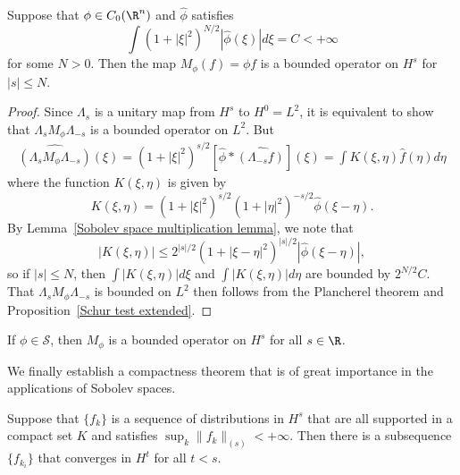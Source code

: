 \begin{theorem}\label{Sobolev space multiplication prop}
Suppose that $\phi\in C_0(\R^n)$ and $\hat{\phi}$ satisfies
\[\int(1+|\xi|^2)^{N/2}|\hat{\phi}(\xi)|d\xi=C<+\infty\]
for some $N>0$. Then the map $M_\phi(f)=\phi f$ is a bounded operator on $H^s$ for $|s|\leq N$.
\end{theorem}
\begin{proof}
Since $\Lambda_s$ is a unitary map from $H^s$ to $H^0=L^2$, it is equivalent to show that $\Lambda_sM_\phi\Lambda_{-s}$ is a bounded operator on $L^2$. But
\begin{align*}
\widehat{(\Lambda_sM_\phi\Lambda_{-s})}(\xi)=(1+|\xi|^2)^{s/2}[\hat{\phi}\ast\widehat{(\Lambda_{-s}f)}](\xi)=\int K(\xi,\eta)\hat{f}(\eta)d\eta
\end{align*}
where the function $K(\xi,\eta)$ is given by
\[K(\xi,\eta)=(1+|\xi|^2)^{s/2}(1+|\eta|^2)^{-s/2}\hat{\phi}(\xi-\eta).\]
By Lemma~\ref{Sobolev space multiplication lemma}, we note that
\[|K(\xi,\eta)|\leq 2^{|s|/2}(1+|\xi-\eta|^2)^{|s|/2}|\hat{\phi}(\xi-\eta)|,\]
so if $|s|\leq N$, then $\int|K(\xi,\eta)|d\xi$ and $\int|K(\xi,\eta)|d\eta$ are bounded by $2^{N/2}C$. That $\Lambda_sM_\phi\Lambda_{-s}$ is bounded on $L^2$ then follows from the Plancherel theorem and Proposition~\ref{Schur test extended}.
\end{proof}
\begin{corollary}\label{Sobolev space multiplication by Schwartz function}
If $\phi\in\mathscr{S}$, then $M_\phi$ is a bounded operator on $H^s$ for all $s\in\R$.
\end{corollary}
We finally establish a compactness theorem that is of great importance in the applications of Sobolev spaces.
\begin{theorem}\label{Sobolev space Rellich thm}
Suppose that $\{f_k\}$ is a sequence of distributions in $H^s$ that are all supported in a compact set $K$ and satisfies $\sup_k\|f_k\|_{(s)}<+\infty$. Then there is a subsequence $\{f_{k_i}\}$ that converges in $H^t$ for all $t<s$.
\end{theorem}
